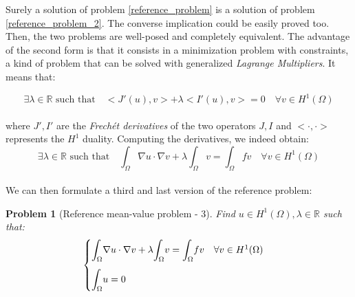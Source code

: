 \documentclass[a4paper,11pt]{article}
\newtheorem{problem}{Problem}
\begin{document}
\noindent Surely a solution of problem \ref{reference_problem} is a solution of problem \ref{reference_problem_2}. The converse implication could be easily proved too. Then, the two problems are well-posed and completely equivalent. The advantage of the second form is that it consists in a minimization problem with constraints, a kind of problem that can be solved with generalized \emph{Lagrange Multipliers}. It means that:

\begin{equation*}
\exists \lambda \in \mathbb{R} \text{ such that} \quad <J'(u),v>+\lambda <I'(u),v>=0 \quad \forall v \in H^1(\Omega)
\end{equation*}\\
\noindent where $J',I'$ are the \emph{Frechét derivatives} of the two operators $J,I$ and $<\cdot,\cdot>$ represents the $H^1$ duality. Computing the derivatives, we indeed obtain:
\begin{equation*}
\exists \lambda \in \mathbb{R} \text{ such that} \quad \int_{\Omega}\nabla u \cdot \nabla v + \lambda \int_\Omega v = \int_{\Omega} fv \quad \forall v \in H^1(\Omega)
\end{equation*}\\

\noindent We can then formulate a third and last version of the reference problem:
\begin{problem}[Reference mean-value problem - 3]\label{reference_problem_3} Find $ u \in H^1(\Omega), \lambda \in \mathbb{R}$ such that:
	\begin{equation*}
	\begin{cases}
	\mathlarger{\int}_{\Omega}\nabla u \cdot \nabla v + \lambda \mathlarger{\int}_\Omega v = \mathlarger{\int}_{\Omega} fv \quad \forall v \in H^1(\Omega) \\[3ex]
	\mathlarger{\int}_{\Omega}u= 0
	\end{cases}
	\end{equation*}
\end{problem}
\end{document}
